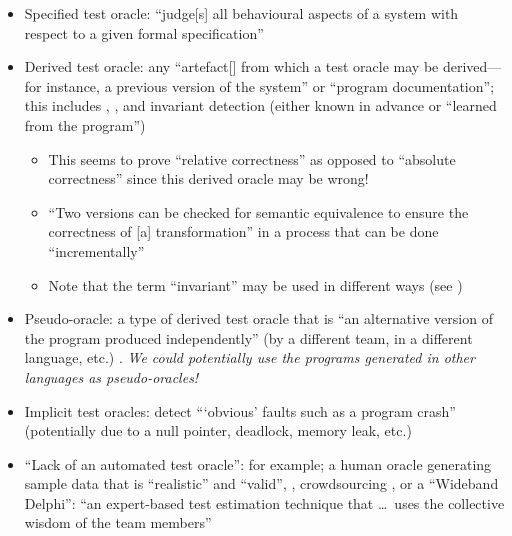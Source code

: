 \begin{itemize}
      \item Specified test oracle: ``judge[s] all behavioural aspects of a
            system with respect to a given formal specification''
            \citep[p.~510]{BarrEtAl2015}
      \item Derived test oracle: any ``artefact[] from which a
            test oracle may be derived---for instance, a previous version of
            the system'' or ``program documentation''; this includes
            ,
            \citep[p.~510]{BarrEtAl2015}, and invariant detection (either
            known in advance or ``learned from the program'')
            \citep[p.~516]{BarrEtAl2015}
            \begin{itemize}
                  \item This seems to prove ``relative correctness'' as
                        opposed to ``absolute correctness''
                        \citep[p.~345]{LahiriEtAl2013} since this derived
                        oracle may be wrong!
                  \item ``Two versions can be checked for semantic equivalence
                        to ensure the correctness of [a] transformation'' in a
                        process that can be done ``incrementally''
                        \citep[p.~345]{LahiriEtAl2013}
                  \item Note that the term ``invariant'' may be used in
                        different ways (see \citep[p.~348]{ChalinEtAl2006})
            \end{itemize}
      \item Pseudo-oracle: a type of derived test oracle that is ``an
            alternative version of the program produced independently'' (by a
            different team, in a different language, etc.)
            \citep[p.~515]{BarrEtAl2015} .
            \emph{We could potentially use the
                  programs generated in other languages as pseudo-oracles!}
      \item Implicit test oracles: detect ```obvious' faults such as a program
            crash'' (potentially due to a null pointer, deadlock, memory leak,
            etc.) \citep[p.~510]{BarrEtAl2015}
      \item ``Lack of an automated test oracle'': for example; a human oracle
            generating sample data that is ``realistic'' and ``valid'',
            \citep[pp.~510-511]{BarrEtAl2015}, crowdsourcing
            \citep[p.~520]{BarrEtAl2015}, or a ``Wideband Delphi'': ``an
            expert-based test estimation technique that \dots\ uses the
            collective wisdom of the team members'' \citepISTQB{}
\end{itemize}

